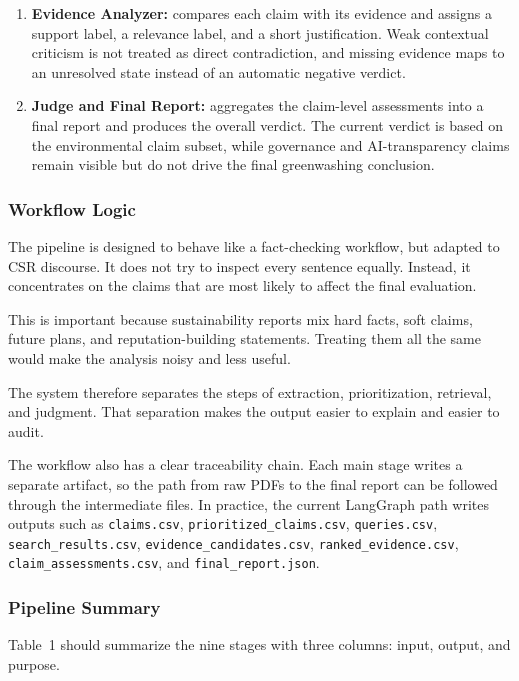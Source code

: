 \begin{enumerate}
    \item \textbf{Evidence Analyzer:} compares each claim with its evidence and assigns a support label, a relevance label, and a short justification. Weak contextual criticism is not treated as direct contradiction, and missing evidence maps to an unresolved state instead of an automatic negative verdict.
    \item \textbf{Judge and Final Report:} aggregates the claim-level assessments into a final report and produces the overall verdict. The current verdict is based on the environmental claim subset, while governance and AI-transparency claims remain visible but do not drive the final greenwashing conclusion.
\end{enumerate}

\subsubsection{Workflow Logic}

The pipeline is designed to behave like a fact-checking workflow, but adapted to CSR discourse. It does not try to inspect every sentence equally. Instead, it concentrates on the claims that are most likely to affect the final evaluation.

This is important because sustainability reports mix hard facts, soft claims, future plans, and reputation-building statements. Treating them all the same would make the analysis noisy and less useful.

The system therefore separates the steps of extraction, prioritization, retrieval, and judgment. That separation makes the output easier to explain and easier to audit.

The workflow also has a clear traceability chain. Each main stage writes a separate artifact, so the path from raw PDFs to the final report can be followed through the intermediate files. In practice, the current LangGraph path writes outputs such as \texttt{claims.csv}, \texttt{prioritized\_claims.csv}, \texttt{queries.csv}, \texttt{search\_results.csv}, \texttt{evidence\_candidates.csv}, \texttt{ranked\_evidence.csv}, \texttt{claim\_assessments.csv}, and \texttt{final\_report.json}.

\subsubsection{Pipeline Summary}

Table~1 should summarize the nine stages with three columns: input, output, and purpose.

